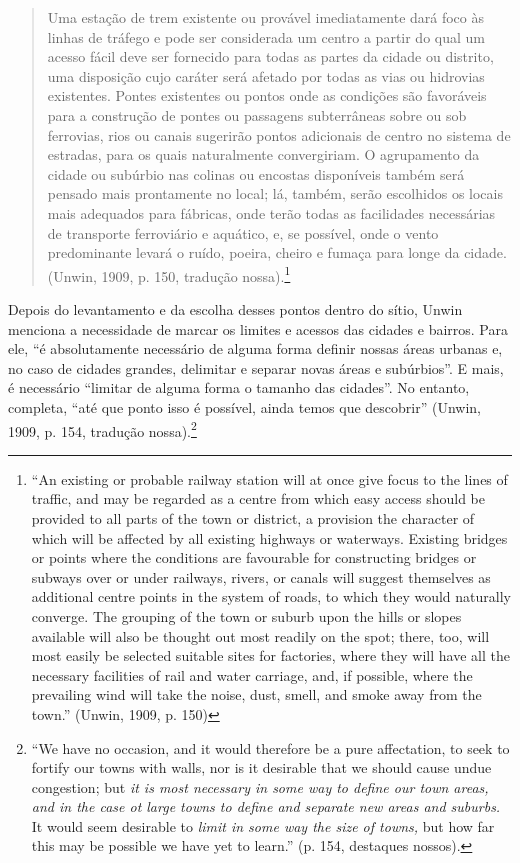 \documentclass[12pt, a4paper]{book} %
\begin{document}
        \begin{quotation}
            Uma estação de trem existente ou provável imediatamente dará foco às linhas de tráfego e pode ser considerada um centro a partir do qual um acesso fácil deve ser fornecido para todas as partes da cidade ou distrito, uma disposição cujo caráter será afetado por todas as vias ou hidrovias existentes. Pontes existentes ou pontos onde as condições são favoráveis para a construção de pontes ou passagens subterrâneas sobre ou sob ferrovias, rios ou canais sugerirão pontos adicionais de centro no sistema de estradas, para os quais naturalmente convergiriam. O agrupamento da cidade ou subúrbio nas colinas ou encostas disponíveis também será pensado mais prontamente no local; lá, também, serão escolhidos os locais mais adequados para fábricas, onde terão todas as facilidades necessárias de transporte ferroviário e aquático, e, se possível, onde o vento predominante levará o ruído, poeira, cheiro e fumaça para longe da cidade. (Unwin, 1909, p. 150, tradução nossa).\footnote[49]{``An existing or probable railway station will at once give focus to the lines of traffic, and may be regarded as a centre from which easy access should be provided to all parts of the town or district, a provision the character of which will be affected by all existing highways or waterways. Existing bridges or points where the conditions are favourable for constructing bridges or subways over or under railways, rivers, or canals will suggest themselves as additional centre points in the system of roads, to which they would naturally converge. The grouping of the town or suburb upon the hills or slopes available will also be thought out most readily on the spot; there, too, will most easily be selected suitable sites for factories, where they will have all the necessary facilities of rail and water carriage, and, if possible, where the prevailing wind will take the noise, dust, smell, and smoke away from the town.'' (Unwin, 1909, p. 150)}
        \end{quotation}

        Depois do levantamento e da escolha desses pontos dentro do sítio, Unwin menciona a necessidade de marcar os limites e acessos das cidades e bairros. Para ele, ``é absolutamente necessário de alguma forma definir nossas áreas urbanas e, no caso de cidades grandes, delimitar e separar novas áreas e subúrbios''. E mais, é necessário ``limitar de alguma forma o tamanho das cidades''. No entanto, completa, ``até que ponto isso é possível, ainda temos que descobrir'' (Unwin, 1909, p. 154, tradução nossa).\footnote[50]{``We have no occasion, and it would therefore be a pure affectation, to seek to fortify our towns with walls, nor is it desirable that we should cause undue congestion; but \textit{it is most necessary in some way to define our town areas, and in the case ot large towns to define and separate new areas and suburbs.} It would seem desirable to \textit{limit in some way the size of towns,} but how far this may be possible we have yet to learn.'' (p. 154, destaques nossos).} 
\end{document}
